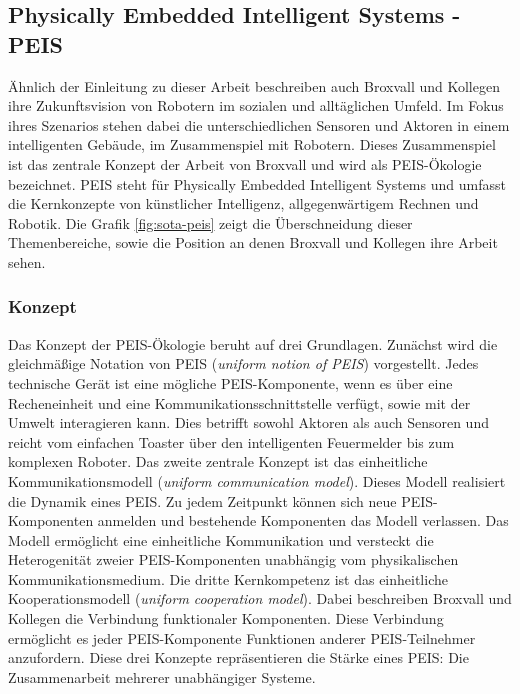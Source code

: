 \subsection{Physically Embedded Intelligent Systems - PEIS}
\label{sec:relatedwork-peis}

Ähnlich der Einleitung zu dieser Arbeit beschreiben auch Broxvall und Kollegen ihre Zukunftsvision von Robotern im sozialen und alltäglichen Umfeld. Im Fokus ihres Szenarios stehen dabei die unterschiedlichen Sensoren und Aktoren in einem intelligenten Gebäude, im Zusammenspiel mit Robotern. Dieses Zusammenspiel ist das zentrale Konzept der Arbeit von Broxvall und wird als PEIS-Ökologie bezeichnet. PEIS steht für Physically Embedded Intelligent Systems und umfasst die Kernkonzepte von künstlicher Intelligenz, allgegenwärtigem Rechnen und Robotik. Die Grafik \ref{fig:sota-peis} zeigt die Überschneidung dieser Themenbereiche, sowie die Position an denen Broxvall und Kollegen ihre Arbeit sehen.\cite{Saffiotti:2005:PEA:1107548.1107615}




\subsubsection{Konzept}
Das Konzept der PEIS-Ökologie beruht auf drei Grundlagen. Zunächst wird die gleichmäßige Notation von PEIS (\textit{uniform notion of PEIS}) vorgestellt. Jedes technische Gerät ist eine mögliche PEIS-Komponente, wenn es über eine Recheneinheit und eine Kommunikationsschnittstelle verfügt, sowie mit der Umwelt interagieren kann. Dies betrifft sowohl Aktoren als auch Sensoren und reicht vom einfachen Toaster über den intelligenten Feuermelder bis zum komplexen Roboter. Das zweite zentrale Konzept ist das einheitliche Kommunikationsmodell (\textit{uniform communication model}). Dieses Modell realisiert die Dynamik eines PEIS. Zu jedem Zeitpunkt können sich neue PEIS-Komponenten anmelden und bestehende Komponenten das Modell verlassen. Das Modell \glqq ermöglicht eine einheitliche Kommunikation und versteckt die Heterogenität zweier PEIS-Komponenten unabhängig vom physikalischen Kommunikationsmedium.\grqq \cite{Saffiotti:2005:PEA:1107548.1107615} Die dritte Kernkompetenz ist das einheitliche Kooperationsmodell (\textit{uniform cooperation model}). Dabei beschreiben Broxvall und Kollegen die Verbindung funktionaler Komponenten. Diese Verbindung ermöglicht es jeder PEIS-Komponente Funktionen anderer PEIS-Teilnehmer anzufordern. Diese drei Konzepte repräsentieren die Stärke eines PEIS: Die Zusammenarbeit mehrerer unabhängiger Systeme. \cite{Saffiotti:2005:PEA:1107548.1107615}

